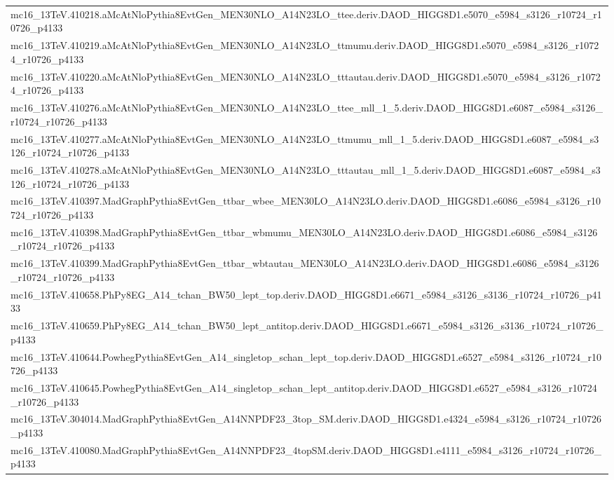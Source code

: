 \begin{adjustwidth}{-3em}{-3em}
\begin{longtable}{l}
mc16\_13TeV.410218.aMcAtNloPythia8EvtGen\_MEN30NLO\_A14N23LO\_ttee.deriv.DAOD\_HIGG8D1.e5070\_e5984\_s3126\_r10724\_r10726\_p4133 \\
mc16\_13TeV.410219.aMcAtNloPythia8EvtGen\_MEN30NLO\_A14N23LO\_ttmumu.deriv.DAOD\_HIGG8D1.e5070\_e5984\_s3126\_r10724\_r10726\_p4133 \\
mc16\_13TeV.410220.aMcAtNloPythia8EvtGen\_MEN30NLO\_A14N23LO\_tttautau.deriv.DAOD\_HIGG8D1.e5070\_e5984\_s3126\_r10724\_r10726\_p4133 \\
mc16\_13TeV.410276.aMcAtNloPythia8EvtGen\_MEN30NLO\_A14N23LO\_ttee\_mll\_1\_5.deriv.DAOD\_HIGG8D1.e6087\_e5984\_s3126\_r10724\_r10726\_p4133 \\
mc16\_13TeV.410277.aMcAtNloPythia8EvtGen\_MEN30NLO\_A14N23LO\_ttmumu\_mll\_1\_5.deriv.DAOD\_HIGG8D1.e6087\_e5984\_s3126\_r10724\_r10726\_p4133 \\
mc16\_13TeV.410278.aMcAtNloPythia8EvtGen\_MEN30NLO\_A14N23LO\_tttautau\_mll\_1\_5.deriv.DAOD\_HIGG8D1.e6087\_e5984\_s3126\_r10724\_r10726\_p4133 \\
mc16\_13TeV.410397.MadGraphPythia8EvtGen\_ttbar\_wbee\_MEN30LO\_A14N23LO.deriv.DAOD\_HIGG8D1.e6086\_e5984\_s3126\_r10724\_r10726\_p4133 \\
mc16\_13TeV.410398.MadGraphPythia8EvtGen\_ttbar\_wbmumu\_MEN30LO\_A14N23LO.deriv.DAOD\_HIGG8D1.e6086\_e5984\_s3126\_r10724\_r10726\_p4133 \\
mc16\_13TeV.410399.MadGraphPythia8EvtGen\_ttbar\_wbtautau\_MEN30LO\_A14N23LO.deriv.DAOD\_HIGG8D1.e6086\_e5984\_s3126\_r10724\_r10726\_p4133 \\
mc16\_13TeV.410658.PhPy8EG\_A14\_tchan\_BW50\_lept\_top.deriv.DAOD\_HIGG8D1.e6671\_e5984\_s3126\_s3136\_r10724\_r10726\_p4133 \\
mc16\_13TeV.410659.PhPy8EG\_A14\_tchan\_BW50\_lept\_antitop.deriv.DAOD\_HIGG8D1.e6671\_e5984\_s3126\_s3136\_r10724\_r10726\_p4133 \\
mc16\_13TeV.410644.PowhegPythia8EvtGen\_A14\_singletop\_schan\_lept\_top.deriv.DAOD\_HIGG8D1.e6527\_e5984\_s3126\_r10724\_r10726\_p4133 \\
mc16\_13TeV.410645.PowhegPythia8EvtGen\_A14\_singletop\_schan\_lept\_antitop.deriv.DAOD\_HIGG8D1.e6527\_e5984\_s3126\_r10724\_r10726\_p4133 \\
mc16\_13TeV.304014.MadGraphPythia8EvtGen\_A14NNPDF23\_3top\_SM.deriv.DAOD\_HIGG8D1.e4324\_e5984\_s3126\_r10724\_r10726\_p4133 \\
mc16\_13TeV.410080.MadGraphPythia8EvtGen\_A14NNPDF23\_4topSM.deriv.DAOD\_HIGG8D1.e4111\_e5984\_s3126\_r10724\_r10726\_p4133 \\

\end{longtable}
\end{adjustwidth}
